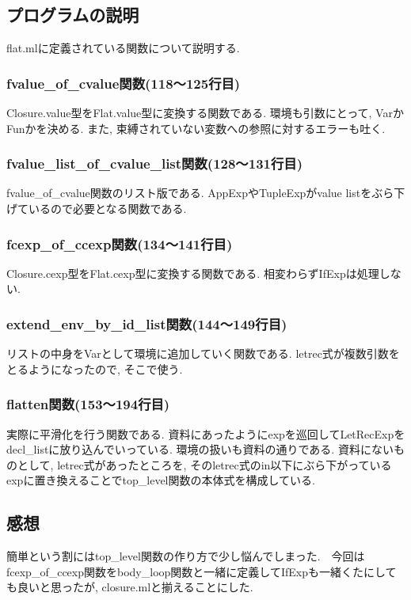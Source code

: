 \documentclass{jarticle}
\begin{document}
\subsection{プログラムの説明}
flat.mlに定義されている関数について説明する.
\subsubsection{fvalue\_of\_cvalue関数(118〜125行目)}
Closure.value型をFlat.value型に変換する関数である. 環境も引数にとって, VarかFunかを決める. また, 束縛されていない変数への参照に対するエラーも吐く.
\subsubsection{fvalue\_list\_of\_cvalue\_list関数(128〜131行目)}
fvalue\_of\_cvalue関数のリスト版である. AppExpやTupleExpがvalue listをぶら下げているので必要となる関数である.
\subsubsection{fcexp\_of\_ccexp関数(134〜141行目)}
Closure.cexp型をFlat.cexp型に変換する関数である. 相変わらずIfExpは処理しない.
\subsubsection{extend\_env\_by\_id\_list関数(144〜149行目)}
リストの中身をVarとして環境に追加していく関数である. letrec式が複数引数をとるようになったので, そこで使う.
\subsubsection{flatten関数(153〜194行目)}
実際に平滑化を行う関数である. 資料にあったようにexpを巡回してLetRecExpをdecl\_listに放り込んでいっている. 環境の扱いも資料の通りである. 資料にないものとして, letrec式があったところを, そのletrec式のin以下にぶら下がっているexpに置き換えることでtop\_level関数の本体式を構成している. 
\subsection{感想}
簡単という割にはtop\_level関数の作り方で少し悩んでしまった.　今回はfcexp\_of\_ccexp関数をbody\_loop関数と一緒に定義してIfExpも一緒くたにしても良いと思ったが, closure.mlと揃えることにした. 
\end{document}
